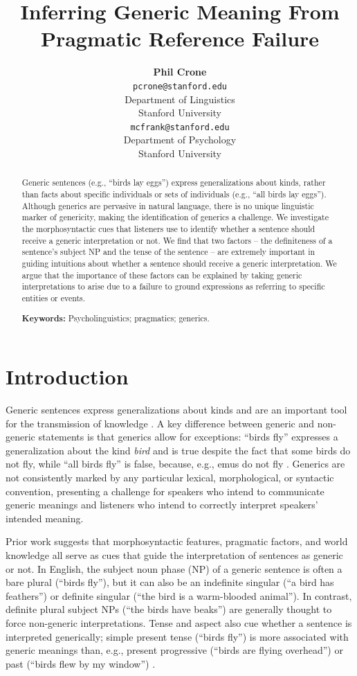 \documentclass[10pt,letterpaper]{article}
\title{Inferring Generic Meaning From Pragmatic Reference Failure}
\author{{\large \bf Phil Crone} \\
	\texttt{pcrone@stanford.edu}\\
  Department of Linguistics \\
  Stanford University
  \And {\large \bf Michael C. Frank} \\
  \texttt{mcfrank@stanford.edu}\\
  Department of Psychology \\
  Stanford University}
\begin{document}
\maketitle

\begin{abstract}
Generic sentences (e.g., ``birds lay eggs'') express generalizations about kinds, rather than facts about specific individuals or sets of individuals (e.g., ``all birds lay eggs''). Although generics are pervasive in natural language, there is no unique linguistic marker of genericity, making the identification of generics a challenge. We investigate the morphosyntactic cues that listeners use to identify whether a sentence should receive a generic interpretation or not. We find that two factors -- the definiteness of a sentence's subject NP and the tense of the sentence -- are extremely important in guiding intuitions about whether a sentence should receive a generic interpretation. We argue that the importance of these factors can be explained by taking generic interpretations to arise due to a failure to ground expressions as referring to specific entities or events.

\textbf{Keywords:} Psycholinguistics; pragmatics; generics.
\end{abstract}


\section{Introduction}

Generic sentences express generalizations about kinds and are an important tool for the transmission of knowledge \cite{gelman2003}. A key difference between generic and non-generic statements is that generics allow for exceptions: ``birds fly'' expresses a generalization about the kind \textit{bird} and is true despite the fact that some birds do not fly, while ``all birds fly'' is false, because, e.g., emus do not fly \cite{Prasada:2000}. Generics are not consistently marked by any particular lexical, morphological, or syntactic convention, presenting a challenge for speakers who intend to communicate generic meanings and listeners who intend to correctly interpret speakers' intended meaning.

Prior work suggests that morphosyntactic features, pragmatic factors, and world knowledge all serve as cues that guide the interpretation of sentences as generic or not. In English, the subject noun phase (NP) of a generic sentence is often a bare plural (``birds fly''), but it can also be an indefinite singular (``a bird has feathers'') or definite singular (``the bird is a warm-blooded animal''). In contrast, definite plural subject NPs (``the birds have beaks'') are generally thought to force non-generic interpretations. Tense and aspect also cue whether a sentence is interpreted generically; simple present tense (``birds fly'') is more associated with generic meanings than, e.g., present progressive (``birds are flying overhead'') or past (``birds flew by my window'') \cite{Carlson:1977,Krifka:1995,Lyons:1977}.
\end{document}
